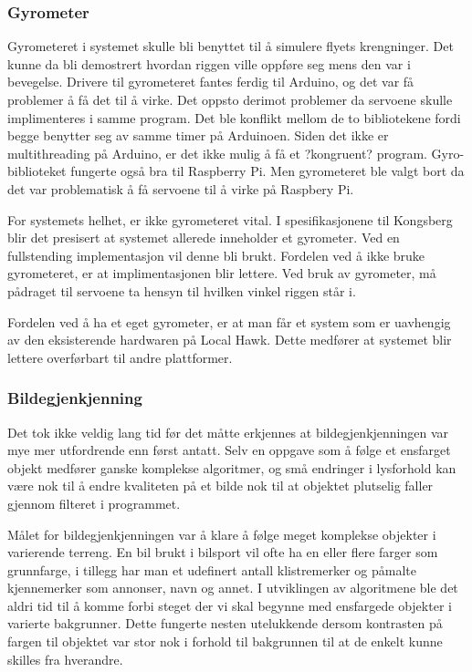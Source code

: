 \subsubsection{Gyrometer}
Gyrometeret i systemet skulle bli benyttet til å simulere flyets krengninger. Det kunne da bli demostrert hvordan riggen ville oppføre seg mens den var i bevegelse. Drivere til gyrometeret fantes ferdig til Arduino, og det var få problemer å få det til å virke. Det oppsto derimot problemer da servoene skulle implimenteres i samme program. Det ble konflikt mellom de to bibliotekene fordi begge benytter seg av samme timer på Arduinoen. Siden det ikke er multithreading på Arduino, er det ikke mulig å få et ?kongruent? program. Gyro-biblioteket fungerte også bra til Raspberry Pi. Men gyrometeret ble valgt bort da det var problematisk å få servoene til å virke på Raspbery Pi. 

For systemets helhet, er ikke gyrometeret vital. I spesifikasjonene til Kongsberg blir det presisert at systemet allerede inneholder et gyrometer. Ved en fullstending implementasjon vil denne bli brukt. Fordelen ved å ikke bruke gyrometeret, er at implimentasjonen blir lettere. Ved bruk av gyrometer, må pådraget til servoene ta hensyn til hvilken vinkel riggen står i. 


Fordelen ved å ha et eget gyrometer, er at man får et system som er uavhengig av den eksisterende hardwaren på Local Hawk. Dette medfører at systemet blir lettere overførbart til andre plattformer.



\subsubsection{Bildegjenkjenning}

Det tok ikke veldig lang tid før det måtte erkjennes at bildegjenkjenningen var mye mer utfordrende enn først antatt. Selv en oppgave som å følge et ensfarget objekt medfører ganske komplekse algoritmer, og små endringer i lysforhold kan være nok til å endre kvaliteten på et bilde nok til at objektet plutselig faller gjennom filteret i programmet.



Målet for bildegjenkjenningen var å klare å følge meget komplekse objekter i varierende terreng. En bil brukt i bilsport vil ofte ha en eller flere farger som grunnfarge, i tillegg har man et udefinert antall klistremerker og påmalte kjennemerker som annonser, navn og annet. I utviklingen av algoritmene ble det aldri tid til å komme forbi steget der vi skal begynne med ensfargede objekter i varierte bakgrunner. Dette fungerte nesten utelukkende dersom kontrasten på fargen til objektet var stor nok i forhold til bakgrunnen til at de enkelt kunne skilles fra hverandre.




